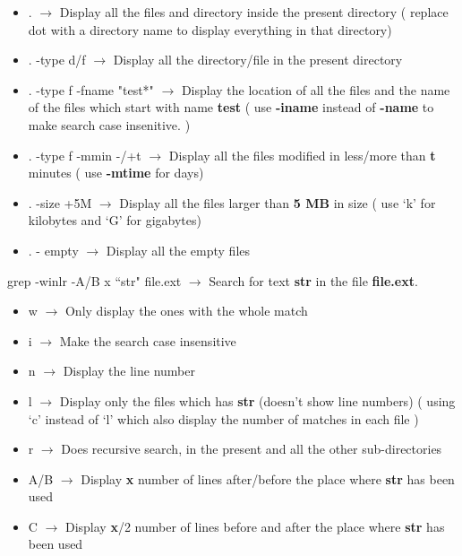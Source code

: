 \documentclass[twoside,a4paper]{article}
\newcommand{\tcb}{\color{blue}}
\newcommand{\tcr}{\color{red}}
\newcommand{\tcg}{\color{gray}}
\newcommand{\tck}{\color{black}}
\newcommand{\ra }{$\rightarrow$ }
\newcommand{\hs}{\hspace}
\begin{document}
\begin{multicols}{2}
\begin{itemize}
		\item \tcb  . \tck \ra Display all the 
		files and directory inside the present directory ( replace dot
		with a directory name to display everything in that directory)
		\item \tcb  . -type d/f \tck \ra 
		Display all the directory/file in the present directory
		\item \tcb  . -type f -fname "test*" \tck 
		\ra Display the location of all the files and the 
		name of the files which start with name \textbf{test} 
		\tcg  ( use \textbf{-iname} instead of \textbf{-name} 
		to make search case insenitive. )\tck 
		\item \tcb  . -type f -mmin -/+t \tck 
		\ra Display all the files modified in less/more than
		\textbf{t} minutes \tcg ( use \textbf{-mtime} for days)
		\tck 
		\item \tck  \tcb  . -size +5M
		\tck  \ra Display all the files larger than
		\textbf{5 MB} in size \tcg ( use `k' for kilobytes and
		`G' for gigabytes)\tck 
		\item \tck  \tcb  . - empty \tck 
		\ra Display all the empty files
	\end{itemize}

	\hs{-0.6 cm}\tcr  grep \tcb  -winlr -A/B x ``str" 
	file.ext \tck  \ra Search for text \textbf{str} in 
	the file \textbf{file.ext}.\\
	\tck 
	\begin{itemize}
		\item \tcr  w \tck  \ra Only display 
		the ones with the whole match
		\item \tcr  i \tck  \ra Make the search
		case insensitive
		\item \tcr  n \tck  \ra Display the 
		line number \item \tcr  l \tck  $\rightarrow$
		Display only the files which has \textbf{str} (doesn't show 
		line numbers) \tcg ( using `c' instead of `l' which
		also display the number of matches in each file ) \tck 
		\item \tcr  r \tck  \ra Does recursive
		search, in the present and all the other sub-directories
		\item \tcr  \tck  A/B \ra Display 
		\textbf{x} number of lines after/before the place where 
		\textbf{str} has been used
		\item \tcr  C \tck  \ra Display
		\textbf{x}/2 number of lines before and after the place where
		\textbf{str} has been used
	\end{itemize}


\end{multicols}
\end{document}
